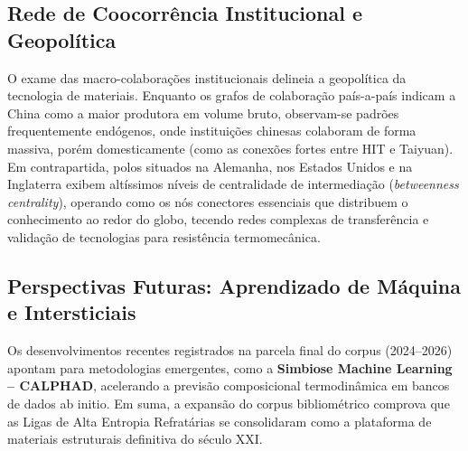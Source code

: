 \subsection{Rede de Coocorrência Institucional e Geopolítica}\label{rede-de-coocorrencia-institucional-e-geopolitica}

O exame das macro-colaborações institucionais delineia a geopolítica da tecnologia de materiais. Enquanto os grafos de colaboração país-a-país indicam a China como a maior produtora em volume bruto, observam-se padrões frequentemente endógenos, onde instituições chinesas colaboram de forma massiva, porém domesticamente (como as conexões fortes entre HIT e Taiyuan). Em contrapartida, polos situados na Alemanha, nos Estados Unidos e na Inglaterra exibem altíssimos níveis de centralidade de intermediação (\emph{betweenness centrality}), operando como os nós conectores essenciais que distribuem o conhecimento ao redor do globo, tecendo redes complexas de transferência e validação de tecnologias para resistência termomecânica.

\subsection{Perspectivas Futuras: Aprendizado de Máquina e Intersticiais}\label{perspectivas-futuras-aprendizado-de-maquina-e-intersticiais}

Os desenvolvimentos recentes registrados na parcela final do corpus (2024--2026) apontam para metodologias emergentes, como a \textbf{Simbiose Machine Learning -- CALPHAD}, acelerando a previsão composicional termodinâmica em bancos de dados ab initio. Em suma, a expansão do corpus bibliométrico comprova que as Ligas de Alta Entropia Refratárias se consolidaram como a plataforma de materiais estruturais definitiva do século XXI.
